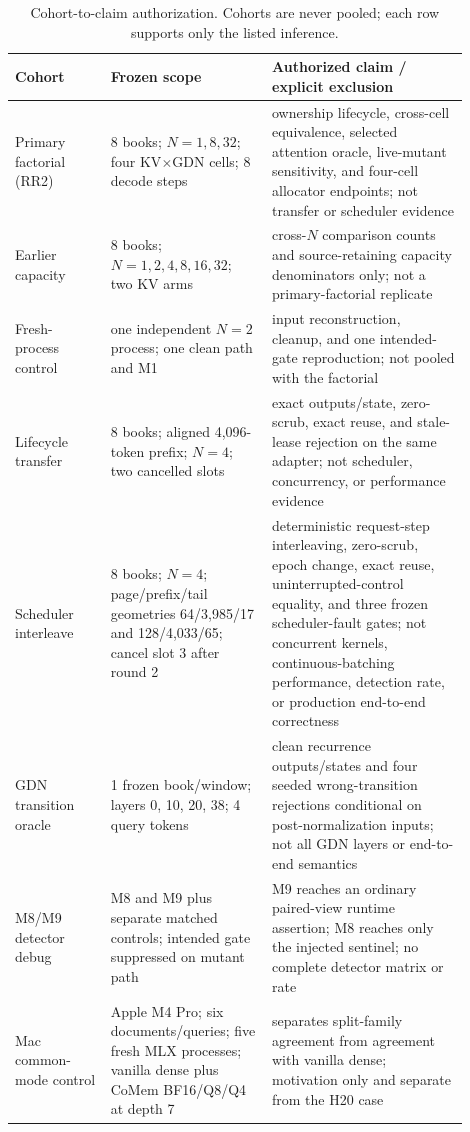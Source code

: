 \documentclass{article}
\begin{document}
\begin{table}[H]
  \caption{Cohort-to-claim authorization.  Cohorts are never pooled; each row
  supports only the listed inference.}
  \label{tab:cohorts}
  \centering
  \footnotesize
  \begin{tabular}{@{}p{0.19\linewidth}p{0.32\linewidth}p{0.39\linewidth}@{}}
    \toprule
    Cohort & Frozen scope & Authorized claim / explicit exclusion \\
    \midrule
    Primary factorial (RR2) & 8 books; $N=1,8,32$; four KV$\times$GDN cells; 8 decode steps & ownership lifecycle, cross-cell equivalence, selected attention oracle, live-mutant sensitivity, and four-cell allocator endpoints; not transfer or scheduler evidence \\
    Earlier capacity & 8 books; $N=1,2,4,8,16,32$; two KV arms & cross-$N$ comparison counts and source-retaining capacity denominators only; not a primary-factorial replicate \\
    Fresh-process control & one independent $N=2$ process; one clean path and M1 & input reconstruction, cleanup, and one intended-gate reproduction; not pooled with the factorial \\
    Lifecycle transfer & 8 books; aligned 4,096-token prefix; $N=4$; two cancelled slots & exact outputs/state, zero-scrub, exact reuse, and stale-lease rejection on the same adapter; not scheduler, concurrency, or performance evidence \\
    Scheduler interleave & 8 books; $N=4$; page/prefix/tail geometries 64/3,985/17 and 128/4,033/65; cancel slot 3 after round 2 & deterministic request-step interleaving, zero-scrub, epoch change, exact reuse, uninterrupted-control equality, and three frozen scheduler-fault gates; not concurrent kernels, continuous-batching performance, detection rate, or production end-to-end correctness \\
    GDN transition oracle & 1 frozen book/window; layers 0, 10, 20, 38; 4 query tokens & clean recurrence outputs/states and four seeded wrong-transition rejections conditional on post-normalization inputs; not all GDN layers or end-to-end semantics \\
    M8/M9 detector debug & M8 and M9 plus separate matched controls; intended gate suppressed on mutant path & M9 reaches an ordinary paired-view runtime assertion; M8 reaches only the injected sentinel; no complete detector matrix or rate \\
    Mac common-mode control & Apple M4 Pro; six documents/queries; five fresh MLX processes; vanilla dense plus CoMem BF16/Q8/Q4 at depth 7 & separates split-family agreement from agreement with vanilla dense; motivation only and separate from the H20 case \\

\end{tabular}
\end{table}
\end{document}
